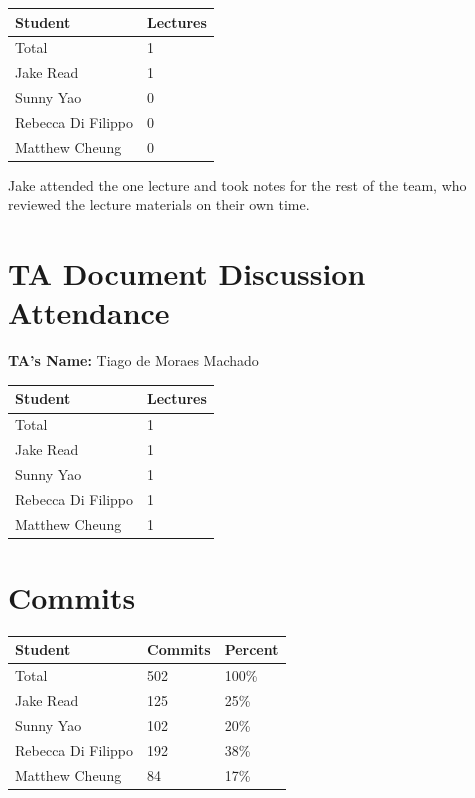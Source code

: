 \documentclass{article}
\begin{document}
\begin{table}[H]
\centering
\begin{tabular}{ll}
\toprule
\textbf{Student} & \textbf{Lectures}\\
\midrule
Total & 1\\
Jake Read & 1\\ %
Sunny Yao & 0\\ %
Rebecca Di Filippo & 0\\ %
Matthew Cheung & 0\\ %
\bottomrule
\end{tabular}
\end{table}

Jake attended the one lecture and took notes for the rest of the team, who reviewed the lecture materials on their own time.

\section{TA Document Discussion Attendance}


\noindent \textbf{TA's Name: } Tiago de Moraes Machado %

\begin{table}[H]
\centering
\begin{tabular}{ll}
\toprule
\textbf{Student} & \textbf{Lectures}\\
\midrule
Total & 1\\
Jake Read & 1\\ %
Sunny Yao & 1\\ %
Rebecca Di Filippo & 1\\ %
Matthew Cheung & 1\\ %
\bottomrule
\end{tabular}
\end{table}


\section{Commits}


\begin{table}[H]
\centering
\begin{tabular}{lll}
\toprule
\textbf{Student} & \textbf{Commits} & \textbf{Percent}\\
\midrule
Total & 502 & 100\% \\
Jake Read & 125 & 25\% \\ %
Sunny Yao & 102 & 20\% \\ %
Rebecca Di Filippo & 192 & 38\% \\ %
Matthew Cheung & 84 & 17\% \\ %
\bottomrule
\end{tabular}
\end{table}
\end{document}
